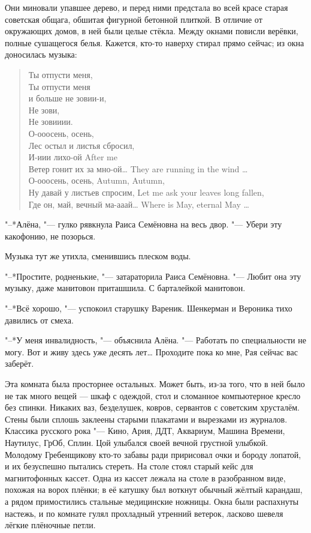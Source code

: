 Они миновали упавшее дерево, и перед ними предстала во всей красе старая советская общага, обшитая фигурной бетонной плиткой.
В отличие от окружающих домов, в ней были целые стёкла.
Между окнами повисли верёвки, полные сушащегося белья.
Кажется, кто-то наверху стирал прямо сейчас;
из окна доносилась музыка:

\begin{quote}
Ты отпусти меня,\\
Ты отпусти меня\\
и больше не зовии-и,\\
Не зови,\\
Не зовииии.\\
О-ооосень, осень,\\
Лес остыл и листья сбросил,\\
{И-иии лихо-ой}
{After me}\\
{Ветер гонит их за мно-ой\ldots{}}
{They are running in the wind \ldots{}}\\
{О-ооосень, осень,}
{Autumn, Autumn,}\\
{Ну давай у листьев спросим,}
{Let me ask your leaves long fallen,}\\
{Где он, май, вечный ма-ааай\ldots{}}
{Where is May, eternal May \ldots{}}
\end{quote}

"--*Алёна, "--- гулко рявкнула Раиса Семёновна на весь двор.
"--- Убери эту какофонию, не позорься.

Музыка тут же утихла, сменившись плеском воды.

"--*Простите, родненькие, "--- затараторила Раиса Семёновна.
"--- Любит она эту музыку, даже манитовон приташшила.
С барталейкой манитовон.

"--*Всё хорошо, "--- успокоил старушку Вареник.
Шенкерман и Вероника тихо давились от смеха.

\asterism

\textspace

"--*У меня инвалидность, "--- объяснила Алёна.
"--- Работать по специальности не могу.
Вот и живу здесь уже десять лет\ldots{}
Проходите пока ко мне, Рая сейчас вас заберёт.

Эта комната была просторнее остальных.
Может быть, из-за того, что в ней было не так много вещей --- шкаф с одеждой, стол и сломанное компьютерное кресло без спинки.
Никаких ваз, безделушек, ковров, сервантов с советским хрусталём.
Стены были сплошь заклеены старыми плакатами и вырезками из журналов.
Классика русского рока "--- Кино, Ария, ДДТ, Аквариум, Машина Времени, Наутилус, ГрОб, Сплин.
Цой улыбался своей вечной грустной улыбкой.
Молодому Гребенщикову кто-то забавы ради пририсовал очки и бороду лопатой, и их безуспешно пытались стереть.
На столе стоял старый кейс для магнитофонных кассет.
Одна из кассет лежала на столе в разобранном виде, похожая на ворох плёнки;
в её катушку был воткнут обычный жёлтый карандаш, а рядом примостились стальные медицинские ножницы.
Окна были распахнуты настежь, и по комнате гулял прохладный утренний ветерок, ласково шевеля лёгкие плёночные петли.

